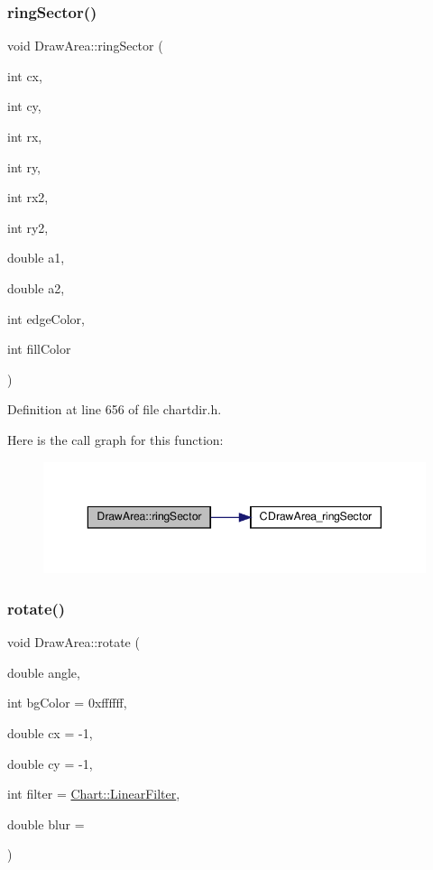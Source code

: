 \subsubsection{\texorpdfstring{ring\+Sector()}{ringSector()}}
{\footnotesize\ttfamily void Draw\+Area\+::ring\+Sector (\begin{DoxyParamCaption}\item[{int}]{cx,  }\item[{int}]{cy,  }\item[{int}]{rx,  }\item[{int}]{ry,  }\item[{int}]{rx2,  }\item[{int}]{ry2,  }\item[{double}]{a1,  }\item[{double}]{a2,  }\item[{int}]{edge\+Color,  }\item[{int}]{fill\+Color }\end{DoxyParamCaption})\hspace{0.3cm}{\ttfamily [inline]}}



Definition at line 656 of file chartdir.\+h.

Here is the call graph for this function\+:
\nopagebreak
\begin{figure}[H]
\begin{center}
\leavevmode
\includegraphics[width=343pt]{class_draw_area_a12358fa55f0f6071857ac5231f26efa7_cgraph}
\end{center}
\end{figure}
\mbox{\label{class_draw_area_a3acdbb124af9bc6a8adab97118b2081a}} 
\subsubsection{\texorpdfstring{rotate()}{rotate()}}
{\footnotesize\ttfamily void Draw\+Area\+::rotate (\begin{DoxyParamCaption}\item[{double}]{angle,  }\item[{int}]{bg\+Color = {\ttfamily 0xffffff},  }\item[{double}]{cx = {\ttfamily -\/1},  }\item[{double}]{cy = {\ttfamily -\/1},  }\item[{int}]{filter = {\ttfamily \hyperlink{namespace_chart_ab75b9aa1781d0e0159ef1d441b577764a8cd729b7a982bac2dce8b021511e3ac6}{Chart\+::\+Linear\+Filter}},  }\item[{double}]{blur = {} }\end{DoxyParamCaption})\hspace{0.3cm}{\ttfamily [inline]}}



